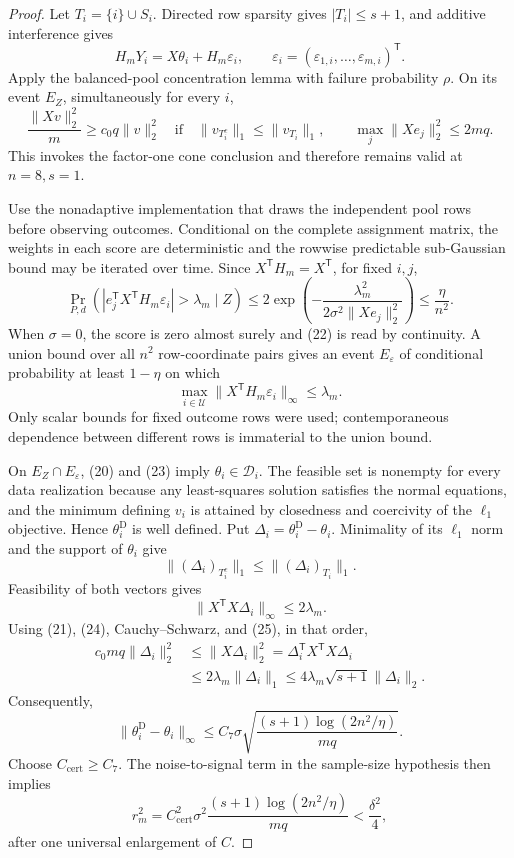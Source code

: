 \documentclass{article}
\begin{document}
\begin{proof}
Let \(T_i=\{i\}\cup S_i\).  Directed row sparsity gives \(|T_i|\le s+1\), and additive interference gives
\[
 H_mY_i=X\theta_i+H_m\varepsilon_i,
 \qquad \varepsilon_i=(\varepsilon_{1,i},\ldots,\varepsilon_{m,i})^{\mathsf T}.
 \tag{20}
\]
Apply the balanced-pool concentration lemma with failure probability \(\rho\).  On its event \(E_Z\), simultaneously for every \(i\),
\[
 \frac{\lVert Xv\rVert_2^2}{m}\ge c_0q\lVert v\rVert_2^2
 \quad\text{if}\quad
 \lVert v_{T_i^c}\rVert_1\le\lVert v_{T_i}\rVert_1,
 \qquad
 \max_j\lVert Xe_j\rVert_2^2\le2mq.
 \tag{21}
\]
This invokes the factor-one cone conclusion and therefore remains valid at \(n=8,s=1\).

Use the nonadaptive implementation that draws the independent pool rows before observing outcomes.  Conditional on the complete assignment matrix, the weights in each score are deterministic and the rowwise predictable sub-Gaussian bound may be iterated over time.  Since \(X^{\mathsf T}H_m=X^{\mathsf T}\), for fixed \(i,j\),
\[
 \Pr_{P,d}\!\left(
  |e_j^{\mathsf T}X^{\mathsf T}H_m\varepsilon_i|>\lambda_m\mid Z
 \right)
 \le2\exp\!\left(-\frac{\lambda_m^2}
 {2\sigma^2\lVert Xe_j\rVert_2^2}\right)
 \le\frac{\eta}{n^2}.
 \tag{22}
\]
When \(\sigma=0\), the score is zero almost surely and (22) is read by continuity.  A union bound over all \(n^2\) row-coordinate pairs gives an event \(E_\varepsilon\) of conditional probability at least \(1-\eta\) on which
\[
 \max_{i\in\mathcal U}\lVert X^{\mathsf T}H_m\varepsilon_i\rVert_\infty
 \le\lambda_m.
 \tag{23}
\]
Only scalar bounds for fixed outcome rows were used; contemporaneous dependence between different rows is immaterial to the union bound.

On \(E_Z\cap E_\varepsilon\), (20) and (23) imply \(\theta_i\in\mathcal D_i\).  The feasible set is nonempty for every data realization because any least-squares solution satisfies the normal equations, and the minimum defining \(v_i\) is attained by closedness and coercivity of the \(\ell_1\) objective.  Hence \(\theta_i^{\mathrm D}\) is well defined.  Put \(\Delta_i=\theta_i^{\mathrm D}-\theta_i\).  Minimality of its \(\ell_1\) norm and the support of \(\theta_i\) give
\[
 \lVert(\Delta_i)_{T_i^c}\rVert_1
 \le\lVert(\Delta_i)_{T_i}\rVert_1.
 \tag{24}
\]
Feasibility of both vectors gives
\[
 \lVert X^{\mathsf T}X\Delta_i\rVert_\infty\le2\lambda_m.
 \tag{25}
\]
Using (21), (24), Cauchy--Schwarz, and (25), in that order,
\[
 \begin{aligned}
 c_0mq\lVert\Delta_i\rVert_2^2
 &\le\lVert X\Delta_i\rVert_2^2
 =\Delta_i^{\mathsf T}X^{\mathsf T}X\Delta_i\\
 &\le2\lambda_m\lVert\Delta_i\rVert_1
 \le4\lambda_m\sqrt{s+1}\lVert\Delta_i\rVert_2.
 \end{aligned}
 \tag{26}
\]
Consequently,
\[
 \lVert\theta_i^{\mathrm D}-\theta_i\rVert_\infty
 \le C_7\sigma\sqrt{\frac{(s+1)\log(2n^2/\eta)}{mq}}.
 \tag{27}
\]
Choose \(C_{\mathrm{cert}}\ge C_7\).  The noise-to-signal term in the sample-size hypothesis then implies
\[
 r_m^2=C_{\mathrm{cert}}^2\sigma^2
 \frac{(s+1)\log(2n^2/\eta)}{mq}<\frac{\delta^2}{4},
 \tag{28}
\]
after one universal enlargement of \(C\).


\end{proof}
\end{document}
